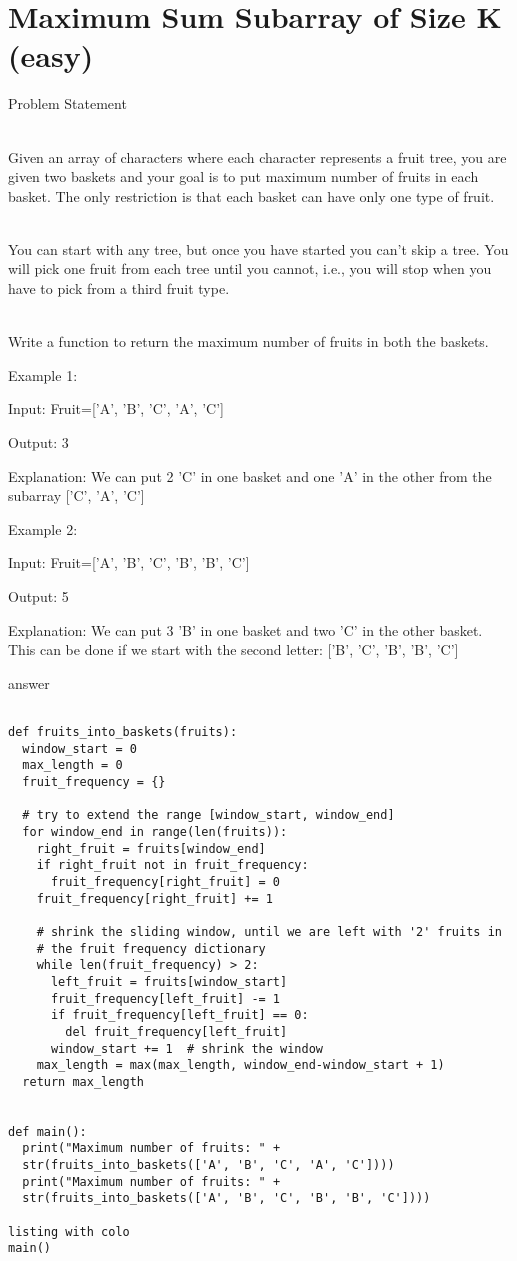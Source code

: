 \section{Maximum Sum Subarray of Size K (easy)}

Problem Statement

\noindent
\\Given an array of characters where each character represents a fruit tree, you are given two baskets and your goal is to put maximum number of fruits in each basket. The only restriction is that each basket can have only one type of fruit.

\noindent
\\You can start with any tree, but once you have started you can’t skip a tree. You will pick one fruit from each tree until you cannot, i.e., you will stop when you have to pick from a third fruit type.

\noindent
\\Write a function to return the maximum number of fruits in both the baskets.

Example 1:

Input: Fruit=['A', 'B', 'C', 'A', 'C']

Output: 3

Explanation: We can put 2 'C' in one basket and one 'A' in the other from the subarray ['C', 'A', 'C']

Example 2:

Input: Fruit=['A', 'B', 'C', 'B', 'B', 'C']

Output: 5

Explanation: We can put 3 'B' in one basket and two 'C' in the other basket. 
This can be done if we start with the second letter: ['B', 'C', 'B', 'B', 'C']


answer

\lstset{language=Python}
\begin{lstlisting}

def fruits_into_baskets(fruits):
  window_start = 0
  max_length = 0
  fruit_frequency = {}

  # try to extend the range [window_start, window_end]
  for window_end in range(len(fruits)):
    right_fruit = fruits[window_end]
    if right_fruit not in fruit_frequency:
      fruit_frequency[right_fruit] = 0
    fruit_frequency[right_fruit] += 1

    # shrink the sliding window, until we are left with '2' fruits in 
    # the fruit frequency dictionary
    while len(fruit_frequency) > 2:
      left_fruit = fruits[window_start]
      fruit_frequency[left_fruit] -= 1
      if fruit_frequency[left_fruit] == 0:
        del fruit_frequency[left_fruit]
      window_start += 1  # shrink the window
    max_length = max(max_length, window_end-window_start + 1)
  return max_length


def main():
  print("Maximum number of fruits: " + 
  str(fruits_into_baskets(['A', 'B', 'C', 'A', 'C'])))
  print("Maximum number of fruits: " + 
  str(fruits_into_baskets(['A', 'B', 'C', 'B', 'B', 'C'])))

listing with colo
main()
    
\end{lstlisting}